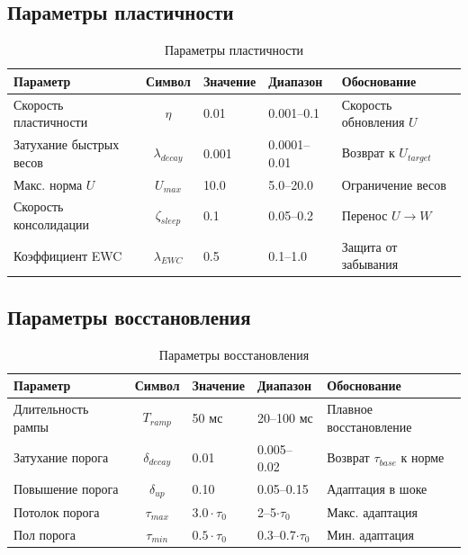 \subsection{Параметры пластичности}

\begin{table}[h]
\centering
\caption{Параметры пластичности}
\label{tab:hyper_plasticity}
\begin{tabular}{lcp{2cm}p{2.5cm}p{4cm}}
\toprule
\textbf{Параметр} & \textbf{Символ} & \textbf{Значение} & \textbf{Диапазон} & \textbf{Обоснование} \\
\midrule
Скорость пластичности & $\eta$ & 0.01 & 0.001–0.1 & Скорость обновления $U$ \\
Затухание быстрых весов & $\lambda_{decay}$ & 0.001 & 0.0001–0.01 & Возврат к $U_{target}$ \\
Макс. норма $U$ & $U_{max}$ & 10.0 & 5.0–20.0 & Ограничение весов \\
Скорость консолидации & $\zeta_{sleep}$ & 0.1 & 0.05–0.2 & Перенос $U \to W$ \\
Коэффициент EWC & $\lambda_{EWC}$ & 0.5 & 0.1–1.0 & Защита от забывания \\
\bottomrule
\end{tabular}
\end{table}

\subsection{Параметры восстановления}

\begin{table}[h]
\centering
\caption{Параметры восстановления}
\label{tab:hyper_recovery}
\begin{tabular}{lcp{2cm}p{2.5cm}p{4cm}}
\toprule
\textbf{Параметр} & \textbf{Символ} & \textbf{Значение} & \textbf{Диапазон} & \textbf{Обоснование} \\
\midrule
Длительность рампы & $T_{ramp}$ & 50 мс & 20–100 мс & Плавное восстановление \\
Затухание порога & $\delta_{decay}$ & 0.01 & 0.005–0.02 & Возврат $\tau_{base}$ к норме \\
Повышение порога & $\delta_{up}$ & 0.10 & 0.05–0.15 & Адаптация в шоке \\
Потолок порога & $\tau_{max}$ & $3.0 \cdot \tau_0$ & 2–5$\cdot \tau_0$ & Макс. адаптация \\
Пол порога & $\tau_{min}$ & $0.5 \cdot \tau_0$ & 0.3–0.7$\cdot \tau_0$ & Мин. адаптация \\
\bottomrule
\end{tabular}
\end{table}

